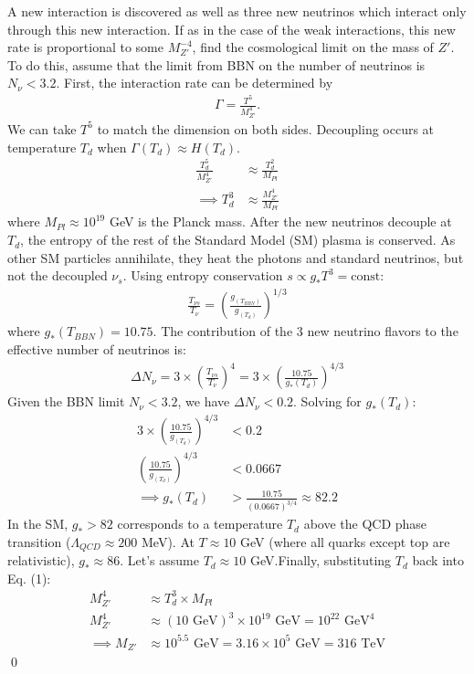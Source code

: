 \clearpage
{}
A new interaction is discovered as well as three new neutrinos which interact only through this new interaction. If as in the case of the weak interactions, this new rate is proportional to some $M_{Z'}^{-4}$, find the cosmological limit on the mass of $Z'$. To do this, assume that the limit from BBN on the number of neutrinos is $N_\nu<3.2$. 
\answer{}
First, the interaction rate can be determined by 
\begin{align}
    \Gamma=\frac{T^5}{M_{Z'}^4}.
\end{align}
We can take $T^5$ to match the dimension on both sides. Decoupling occurs at temperature $T_d$ when $\Gamma(T_d) \approx H(T_d)$.
\begin{align}
\frac{T_d^5}{M_{Z'}^4} &\approx \frac{T_d^2}{M_{Pl}} \\
\implies T_d^3 &\approx \frac{M_{Z'}^4}{M_{Pl}} 
\end{align}
where $M_{Pl} \approx 10^{19}$ GeV is the Planck mass. After the new neutrinos decouple at $T_d$, the entropy of the rest of the Standard Model (SM) plasma is conserved. As other SM particles annihilate, they heat the photons and standard neutrinos, but not the decoupled $\nu_s$. Using entropy conservation $s \propto g_* T^3 = \text{const}$:
\begin{align}
    \frac{T_{\nu s}}{T_\nu} = \left( \frac{g_(T_{BBN})}{g_(T_d)} \right)^{1/3}
\end{align}
where $g_*(T_{BBN}) = 10.75$. The contribution of the 3 new neutrino flavors to the effective number of neutrinos is:
\begin{align}
\Delta N_\nu = 3 \times \left( \frac{T_{\nu s}}{T_\nu} \right)^4 = 3 \times \left( \frac{10.75}{g_*(T_d)} \right)^{4/3}
\end{align}
Given the BBN limit $N_\nu < 3.2$, we have $\Delta N_\nu < 0.2$. Solving for $g_*(T_d)$:
\begin{align}3 \times \left( \frac{10.75}{g_(T_d)} \right)^{4/3} &< 0.2 \\
\left( \frac{10.75}{g_(T_d)} \right)^{4/3} &< 0.0667 \\ \implies g_*(T_d) &> \frac{10.75}{(0.0667)^{3/4}} \approx 82.2
\end{align}
In the SM, $g_* > 82$ corresponds to a temperature $T_d$ above the QCD phase transition ($\Lambda_{QCD} \approx 200$ MeV). At $T \approx 10$ GeV (where all quarks except top are relativistic), $g_* \approx 86$. Let's assume $T_d \approx 10$ GeV.Finally, substituting $T_d$ back into Eq. (1):
\begin{align}
    M_{Z'}^4 &\approx T_d^3 \times M_{Pl} \\
    M_{Z'}^4 &\approx (10 \text{ GeV})^3 \times 10^{19} \text{ GeV} = 10^{22} \text{ GeV}^4 \\ 
    \implies M_{Z'} &\approx 10^{5.5} \text{ GeV} = {3.16 \times 10^5 \text{ GeV} = 316 \text{ TeV}}
\end{align}\qed


